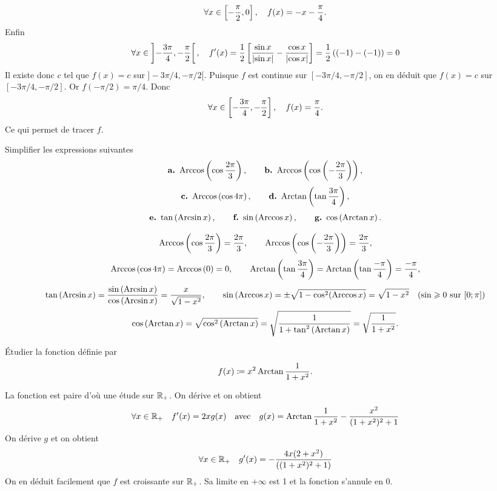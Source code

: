\documentclass{magnolia}
\begin{document}
\begin{sol}
\begin{questions}
\[\forall x\in\left[-\frac{\pi}{2},0\right],\quad f(x)=-x-\frac{\pi}{4}.\]
Enfin
\[\forall x\in\left]-\frac{3\pi}{4},-\frac{\pi}{2}\right[,\quad f'(x)=\frac{1}{2}\left[\frac{\sin x}{\left|\sin x\right|}-\frac{\cos x}{\left|\cos x\right|}\right]=\frac{1}{2}\left((-1)-(-1)\right)=0\]
Il existe donc $c$ tel que $f(x)=c$ sur $]-3\pi/4,-\pi/2[$. Puisque $f$ est continue sur $[-3\pi/4,-\pi/2]$, on en déduit que $f(x)=c$ sur $[-3\pi/4,-\pi/2]$. Or $f(-\pi/2)=\pi/4$. Donc
\[\forall x\in\left[-\frac{3\pi}{4},-\frac{\pi}{2}\right],\quad f(x)=\frac{\pi}{4}.\]
Ce qui permet de tracer $f$.
\end{questions}
\end{sol}


Simplifier les expressions suivantes
$$\textbf{a.}\ \operatorname{Arccos}\left(\cos\frac{2\pi}{3}\right), \qquad \textbf{b.}\ \operatorname{Arccos}\left(\cos\left(-\frac{2\pi}{3}\right)\right),$$
$$\textbf{c.}\ \operatorname{Arccos}\left(\cos 4\pi\right), \qquad \textbf{d.}\ \operatorname{Arctan}\left(\tan\frac{3\pi}{4}\right),$$ 
$$\textbf{e.}\ \tan\left(\operatorname{Arcsin} x\right), \qquad \textbf{f.}\ \sin\left(\operatorname{Arccos} x\right), \qquad \textbf{g.}\ \cos\left(\operatorname{Arctan} x\right).$$
\begin{sol}
$$\operatorname{Arccos}\left(\cos\frac{2\pi}{3}\right)=\frac{2\pi}{3}, \qquad \operatorname{Arccos}\left(\cos\left(-\frac{2\pi}{3}\right)\right)=\frac{2\pi}{3},$$
$$\operatorname{Arccos}\left(\cos 4\pi\right)=\operatorname{Arccos}\left(0\right)=0, \qquad \operatorname{Arctan}\left(\tan\frac{3\pi}{4}\right)=\operatorname{Arctan}\left(\tan\frac{-\pi}{4}\right)=\frac{-\pi}{4},$$ 
$$\tan\left(\operatorname{Arcsin} x\right)=\frac{\sin\left(\operatorname{Arcsin} x\right)}{\cos\left(\operatorname{Arcsin} x\right)}=\frac{x}{\sqrt{1-x^2}}, \qquad \sin\left(\operatorname{Arccos} x\right)=\pm \sqrt{1-\cos^2(\operatorname{Arccos} x)}=\sqrt{1-x^2} \quad (\sin \geqslant 0 \text{ sur } [0;\pi])$$
$$\cos\left(\operatorname{Arctan} x\right)=\sqrt{\cos^2\left(\operatorname{Arctan} x\right)}=\sqrt{\frac{1}{1+\tan^2\left(\operatorname{Arctan} x\right)}}=\sqrt{\frac{1}{1+x^2}}.$$
\end{sol}

Étudier la fonction définie par
$$f(x)\coloneqq x^2 \operatorname{Arctan}\frac{1}{1+x^2}.$$
\begin{sol}
La fonction est paire d'où une étude sur $\mathbb{R}_+$. On dérive et on obtient
\[\forall x\in\mathbb{R}_+ \quad f'(x)=2xg(x) \quad\text{avec}\quad g(x)=
   \operatorname{Arctan}\frac{1}{1+x^2}-\frac{x^2}{(1+x^2)^2+1}\]
On dérive $g$ et on obtient
\[\forall x\in\mathbb{R}_+ \quad g'(x)=-\frac{4x(2+x^2)}{\left((1+x^2)^2+1\right)}\]
On en déduit facilement que $f$ est croissante sur $\mathbb{R}_+$. Sa limite en $+\infty$
est 1 et la fonction s'annule en 0.
\end{sol}
\end{document}
